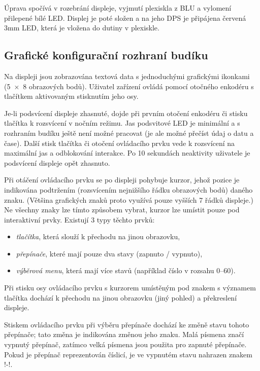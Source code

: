 Úprava spočívá v rozebrání displeje, vyjmutí plexiskla z BLU a vylomení
přilepené bílé LED. Displej je poté složen a na jeho DPS je připájena červená
\num{3}\si{\milli\meter} LED, která je vložena do dutiny v plexiskle.


\FloatBarrier
\subsection{Grafické konfigurační rozhraní budíku}
Na displeji jsou zobrazována textová data s jednoduchými grafickými ikonkami
(\num{5 x 8} obrazových bodů). Uživatel zařízení ovládá pomocí otočného
enkodéru s tlačítkem aktivovaným stisknutím jeho osy.

Je-li podsvícení displeje zhasnuté, dojde při prvním otočení enkodéru či stisku
tlačítka k rozsvícení v nočním režimu. Jas podsvitové LED je minimální
a s rozhraním budíku ještě není možné pracovat (je ale možné přečíst údaj
o datu a čase). Další stisk tlačítka či otočení ovládacího prvku vede
k rozsvícení na maximální jas a odblokování interakce. Po \num{10} sekundách
neaktivity uživatele je podsvícení displeje opět zhasnuto.

Při otáčení ovládacího prvku se po displeji pohybuje kurzor, jehož pozice je
indikována podtržením (rozsvícením nejnižšího řádku obrazových bodů) daného
znaku. (Většina grafických znaků proto využívá pouze vyšších \num{7} řádků
displeje.) Ne všechny znaky lze tímto způsobem vybrat, kurzor lze umístit pouze
pod interaktivní prvky. Existují 3 typy těchto prvků:
\begin{itemize}[nosep]
    \item \emph{tlačítka}, která slouží k přechodu na jinou obrazovku,
    \item \emph{přepínače}, které mají pouze dva stavy (zapnuto / vypnuto),
    \item \emph{výběrová menu}, která mají více stavů (například číslo
        v rozsahu \numrange{0}{60}).
\end{itemize}

Při stisku osy ovládacího prvku s kurzorem umístěným pod znakem s významem
tlačítka dochází k přechodu na jinou obrazovku (jiný pohled) a překreslení
displeje.

Stiskem ovládacího prvku při výběru přepínače dochází ke změně stavu tohoto
přepínače; tato změna je indikována změnou jeho znaku. Malá písmena značí
vypnutý přepínač, zatímco velká písmena jsou použita pro zapnuté přepínače.
Pokud je přepínač reprezentován číslicí, je ve vypnutém stavu nahrazen znakem
!-!.

